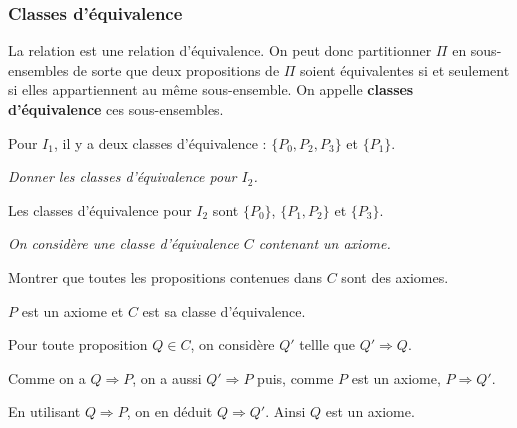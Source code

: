 \subsubsection{Classes d'équivalence}
La relation est une relation d'équivalence. On peut donc partitionner $\Pi$ en sous-ensembles de sorte que deux propositions de $\Pi$ soient équivalentes si et seulement si elles appartiennent au même sous-ensemble. On appelle {\bf classes d'équivalence} ces sous-ensembles.


Pour $I_1$, il y a deux classes d'équivalence :  $\{P_{0}, P_{2}, P_{3}\}$ et $\{P_{1}\}$.
\begin{Exercise}\it
Donner les classes d'équivalence pour $I_2$.
\end{Exercise}
\begin{Answer}

Les classes d'équivalence pour $I_2$ sont $\{P_{0}\}$, $\{P_{1},P_{2}\}$ et $\{P_{3}\}$.
\end{Answer}
\begin{Exercise}\it
On considère une classe d'équivalence $C$ contenant un axiome.

Montrer que toutes les propositions contenues dans $C$ sont des axiomes.
\end{Exercise}
\begin{Answer}
$P$ est un axiome et $C$ est sa classe d'équivalence.

Pour toute proposition $Q\in C$, on considère $Q'$ tellle que $Q'\Rightarrow Q$. 

Comme on a $Q\Rightarrow P$, on a aussi  $Q'\Rightarrow P$ puis, comme $P$ est un axiome, $P\Rightarrow Q'$.

En utilisant $Q\Rightarrow P$, on en déduit  $Q\Rightarrow Q'$. 
Ainsi $Q$ est un axiome.
\end{Answer}

